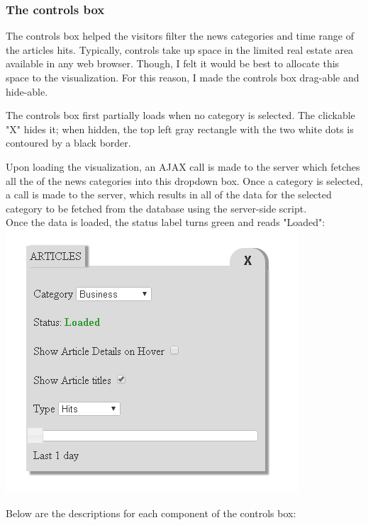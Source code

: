 \documentclass[12pt]{article}
\begin{document}
{\subsubsection{The controls box}

The controls box helped the visitors filter the news categories and time range of the articles hits. Typically, controls take up space in the limited real estate area available in any web browser. Though, I felt it would be best to allocate this space to the visualization. For this reason, I made the controls box drag-able and hide-able.

\noindent The controls box first partially loads when no category is selected. The clickable "X" hides it; when hidden, the top left gray rectangle with the two white dots is contoured by a black border.

Upon loading the visualization, an AJAX call is made to the server which fetches all the of the news categories into this dropdown box. Once a category is selected, a call is made to the server, which results in all of the data for the selected category to be fetched from the database using the server-side script.\\ 
\noindent Once the data is loaded, the status label turns green and reads "Loaded":\\

\noindent\includegraphics[scale=1]{img/viz_5}

\newpage

\noindent Below are the descriptions for each component of the controls box:

}
\end{document}
